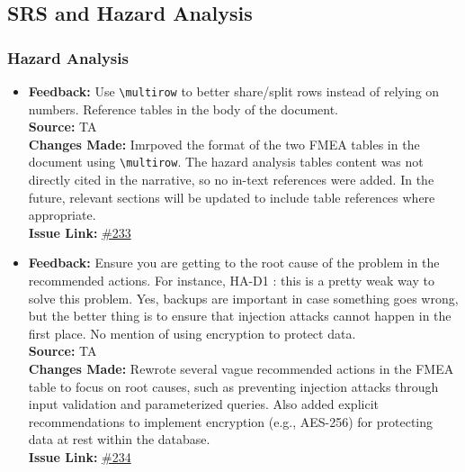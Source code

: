 \documentclass{article}
\begin{document}

\subsection{SRS and Hazard Analysis}

\subsubsection{Hazard Analysis}

\begin{itemize}
    \item 
      \textbf{Feedback:} Use \verb|\multirow| to better share/split rows instead of relying on numbers. Reference tables in the body of the document. \\
      \textbf{Source:} TA \\
      \textbf{Changes Made:} Imrpoved the format of the two FMEA tables in the document using \verb|\multirow|. The hazard analysis tables content was not directly cited in the narrative, so no in-text references were added. In the future, relevant sections will be updated to include table references where appropriate.\\
      \textbf{Issue Link:} \href{https://github.com/parishanizam/TeleHealth/issues/233}{\#233}

      \item 
      \textbf{Feedback:} Ensure you are getting to the root cause of the problem in the recommended actions. For instance, HA-D1 : this is a pretty weak way to solve this problem. Yes, backups are important in case something goes wrong, but the better thing is to ensure that injection attacks cannot happen in the first place. No mention of using encryption to protect data.\\
      \textbf{Source:} TA \\
      \textbf{Changes Made:} Rewrote several vague recommended actions in the FMEA table to focus on root causes, such as preventing injection attacks through input validation and parameterized queries. Also added explicit recommendations to implement encryption (e.g., AES-256) for protecting data at rest within the database. \\
      \textbf{Issue Link:} \href{https://github.com/parishanizam/TeleHealth/issues/234}{\#234}


\end{itemize}
\end{document}
